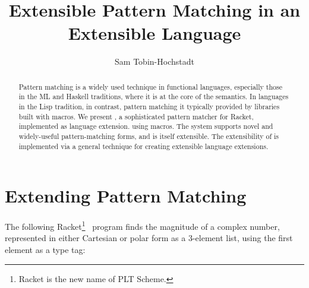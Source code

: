 \documentclass[onecolumn]{llncs}
\author{Sam Tobin-Hochstadt}
\institute{PLT @ Northeastern University\\
           {\tt samth@ccs.neu.edu}}
\newcommand{\sectionNewpage}{}
\newcommand{\preDoc}{}
\newcommand{\Scribtexttt}[1]{{\texttt{#1}}}
\newcommand{\titleAndEmptyVersionAndEmptyAuthors}[3]{\title{#1}\maketitle}
\newcommand{\SColorize}[2]{\color{#1}{#2}}
\newcommand{\inColor}[2]{{\Scribtexttt{\SColorize{#1}{#2}}}}
\newcommand{\RktSym}[1]{\inColor{IdentifierColor}{#1}}
\renewcommand{\sectionNewpage}{}
\begin{document}
\preDoc
\titleAndEmptyVersionAndEmptyAuthors{Extensible Pattern Matching in an Extensible Language}{}{}
\label{t:x28part_x22Extensiblex5fPatternx5fMatchingx5finx5fanx5fExtensiblex5fLanguagex22x29}

\begin{abstract}Pattern matching is a widely used technique in
functional languages, especially those in the ML and
Haskell traditions, where it is at the core of the semantics.
  In languages in the Lisp tradition, in contrast, pattern
matching it typically provided by
libraries built with macros.  We
present \RktSym{\RktStxLink{match}}, a sophisticated pattern matcher for Racket, implemented as
language extension.
using macros.  The system supports novel and widely{-}useful pattern{-}matching
forms, and is itself extensible. The extensibility of
\RktSym{\RktStxLink{match}} is implemented via a general technique for creating
extensible language extensions.\end{abstract}

\sectionNewpage

\section[Extending Pattern Matching]{Extending Pattern Matching}\label{t:x28part_x22introx22x29}

The following Racket\footnote{Racket is the new name of PLT Scheme.}~\cite{plttr1}
 program finds the magnitude of a complex number,
represented in either Cartesian or polar form as a 3{-}element list,
 using the first element as a type tag:
\end{document}
